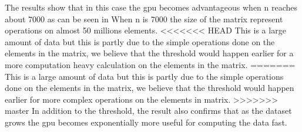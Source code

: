 The results show that in this case the \acrshort{gpu} becomes advantageous when n reaches about 7000 as can be seen in 
When n is 7000 the size of the matrix represent operations on almost 50 millions elements.
<<<<<<< HEAD
This is a large amount of data but this is partly due to the simple operations done on the elements in the matrix, we believe that the threshold would happen earlier for a more computation heavy calculation on the elements in the matrix.
=======
This is a large amount of data but this is partly due to the simple operations done on the elements in the matrix, we believe that the threshold would happen earlier for more complex operations on the elements in matrix.
>>>>>>> master
In addition to the threshold, the result also confirms that as the dataset grows the \acrshort{gpu} becomes exponentially more useful for computing the data fast.
